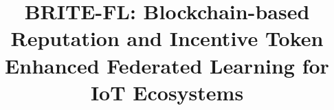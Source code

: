 \documentclass[a4paper]{cas-dc}
\begin{document}
		\let\WriteBookmarks\relax
		\def\floatpagepagefraction{1}
		\def\textpagefraction{.001}
		
		
		
		\title[mode = title]{BRITE-FL: Blockchain-based Reputation and Incentive Token Enhanced Federated Learning for IoT Ecosystems}  
		
		
		
		
		
		
		
		
		
		
		
\end{document}
